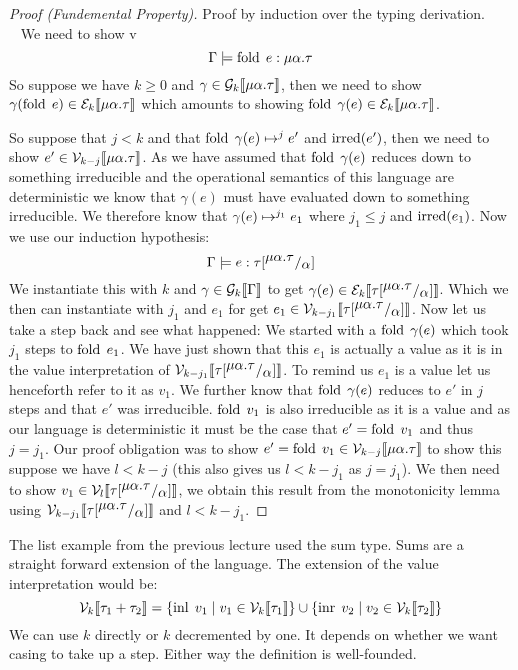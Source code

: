 \begin{proof}[Proof (Fundemental Property)]
Proof by induction over the typing derivation.
\case{\TFold} \\~
We need to show 
\newcommand{\mat}{\ensuremath{\mu\alpha.\tau}}
v\[
  \Gamma \models \fold \; e : \mat
\]
So suppose we have $k \geq 0$ and $\gamma \in \gpres{\mat}$, then we need to show $\gamma(\fold\; e) \in \epres{\mat}$ which amounts to showing $\fold\; \gamma(e) \in \epres{\mat}$.

So suppose that $j<k$ and that $\fold\; \gamma(e) \evaltos[j] e'$ and $\irred(e')$, then we need to show $e' \in \vpres[k-j]{\mat}$. As we have assumed that $\fold\; \gamma(e)$ reduces down to something irreducible and the operational semantics of this language are deterministic we know that $\gamma(e)$ must have evaluated down to something irreducible. We therefore know that $\gamma(e) \evaltos[j_1] e_1$ where $j_1 \leq j$ and $\irred(e_1)$.
Now we use our induction hypothesis:
\newcommand{\tsub}{\ensuremath{\sub{\tau}{\mat}{\alpha}}}
\[
  \Gamma \models e : \tsub
\]
We instantiate this with $k$ and $\gamma \in \gpres{\Gamma}$ to get $\gamma(e) \in \epres{\tsub}$. Which we then can instantiate with $j_1$ and $e_1$ for get $e_1 \in \vpres[k-j_1]{\tsub}$. Now let us take a step back and see what happened: We started with a $\fold\; \gamma(e)$ which took $j_1$ steps to $\fold\; e_1$. We have just shown that this $e_1$ is actually a value as it is in the value interpretation of $\vpres[k-j_1]{\tsub}$. To remind us $e_1$ is a value let us henceforth refer to it as $v_1$. We further know that $\fold\; \gamma(e)$ reduces to $e'$ in $j$ steps and that $e'$ was irreducible. $\fold\; v_1$ is also irreducible as it is a value and as our language is deterministic it must be the case that $e' = \fold\; v_1$ and thus $j = j_1$. Our proof obligation was to show $e' = \fold \; v_1 \in \vpres[k-j]{\mat}$ to show this suppose we have $l < k-j$ (this also gives us $l < k-j_1$ as $j = j_1$). We then need to show $v_1 \in \vpres[l]{\tsub}$, we obtain this result from the monotonicity lemma using $\vpres[k-j_1]{\tsub}$ and $l < k-j_1$.
\end{proof}

The list example from the previous lecture used the sum type. Sums are a straight forward extension of the language. The extension of the value interpretation would be:
\[
  \vpres{\tau_1 + \tau_2} = \{\inl \; v_1 \vbar v_1 \in \vpres{\tau_1}\} \cup 
                            \{\inr \; v_2 \vbar v_2 \in \vpres{\tau_2}\}
\]
We can use $k$ directly or $k$ decremented by one. It depends on whether we want casing to take up a step. Either way the definition is well-founded. 


